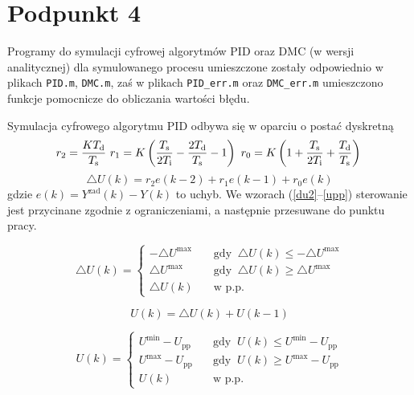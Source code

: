\chapter{Podpunkt 4}
Programy do symulacji cyfrowej algorytmów PID oraz DMC (w wersji analitycznej) dla symulowanego procesu umieszczone zostały odpowiednio w plikach \verb+PID.m+, \verb+DMC.m+, zaś w plikach \verb+PID_err.m+ oraz \verb+DMC_err.m+ umieszczono funkcje pomocnicze do obliczania wartości błędu.

Symulacja cyfrowego algorytmu PID odbywa się w oparciu o postać dyskretną
\begin{equation}
r_2 = \frac{K T_{\mathrm{d}}}{T_{\mathrm{s}}} \
r_1 = K \left( \frac{T_{\mathrm{s}}}{2 T_{\mathrm{i}}} - \frac{2 T_{\mathrm{d}}}{T_{\mathrm{s}}} - 1 \right) \
r_0 = K \left( 1 + \frac{T_{\mathrm{s}}}{2 T_{\mathrm{i}}} + \frac{T_{\mathrm{d}}}{T_{\mathrm{s}}} \right) \\
\label{r_t}
\end{equation}
\begin{equation}
\triangle U(k) = r_2 e(k-2) + r_1 e(k-1) + r_0 e(k)
\label{du}
\end{equation}
gdzie $e(k)=Y^{\mathrm{zad}}(k) - Y(k)$ to uchyb. We wzorach (\ref{du2}--\ref{upp}) sterowanie jest przycinane zgodnie z ograniczeniami, a następnie przesuwane do punktu pracy.

\begin{equation}
\triangle U(k) = 
\begin{cases}
-\triangle U^{\mathrm{max}} &\quad \textrm{gdy } \ \triangle U(k) \le -\triangle U^{\mathrm{max}} \\
\triangle U^{\mathrm{max}} &\quad \textrm{gdy } \ \triangle U(k) \ge \triangle U^{\mathrm{max}}  \\
\triangle U(k) &\quad \textrm{w p.p.}
\end{cases}
\label{du2}
\end{equation}

\begin{equation}
U(k) = \triangle U(k) + U(k-1)
\label{uk}
\end{equation}

\begin{equation}
U(k) = 
\begin{cases}
U^{\mathrm{min}} - U_{\mathrm{pp}} &\quad \textrm{gdy } \ U(k) \le U^{\mathrm{min}}-U_{\mathrm{pp}} \\
U^{\mathrm{max}}-U_{\mathrm{pp}} &\quad \textrm{gdy } \ U(k) \ge U^{\mathrm{max}}-U_{\mathrm{pp}}  \\
U(k) &\quad \textrm{w p.p.}
\end{cases}
\label{uk2}
\end{equation}

